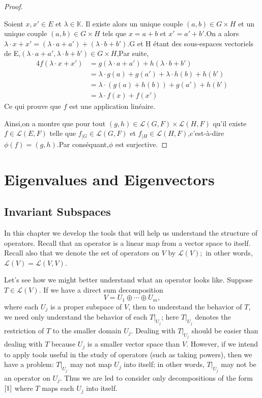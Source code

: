 \documentclass[12pt]{book}
\theoremstyle{definition}\newtheorem{dfn}{Définition}[chapter]
\theoremstyle{plain}\newtheorem{thm}{Théorème}[chapter]
\theoremstyle{plain}\newtheorem{prp}{Proposition}[chapter]
\theoremstyle{plain}\newtheorem{lem}{\bf Lemme}[chapter]
\theoremstyle{plain}\newtheorem{axm}{\bf Axiome}[chapter]
\theoremstyle{plain}\newtheorem{lmm}{\bf Lemme}[chapter]
\theoremstyle{plain}\newtheorem{exm}{\bf Example}[chapter]
\theoremstyle{plain}\newtheorem{cor}{\bf Corollaire}[chapter]
\theoremstyle{remark}\newtheorem{rem}{Remarque}[chapter]
\begin{document}
\begin{proof}
\begin{itemize}
\begin{itemize}
 Soient $x,x'\in E$ et $\lambda \in \mathbb{K}$.
 Il existe alors un unique couple $(a,b)\in G\times H$ et un unique couple $(a,b)\in G\times H$ tels que $x=a+b$ et $x'=a'+b'$.On a alors $\lambda \cdot x+x'=(\lambda\cdot a+a')+(\lambda\cdot b+b')$.G et H étant des sous-espaces vectoriels de E,$ (\lambda\cdot a+a',\lambda\cdot b+b')\in G\times H$,Par suite,
 \begin{alignat*}{4}
 f(\lambda\cdot x+x')&=g(\lambda\cdot a+a')+h(\lambda\cdot b+b')\\
 &=\lambda \cdot g(a)+g(a')+\lambda\cdot h(b)+h(b')\\
 &=\lambda\cdot(g(a)+h(b))+g(a')+h(b')\\
 &=\lambda\cdot f(x)+f(x')
 \end{alignat*}
 Ce qui prouve que $f$ est une application linéaire.
\end{itemize}
\end{itemize}
Ainsi,on a montre que pour tout $(g,h)\in \mathcal{L}(G,F)\times \mathcal{L}(H,F)$ qu'il existe $f\in \mathcal{L}(E,F)$ telle que
$f_{|G}\in\mathcal{L}(G,F)$
et $f_{|H}\in\mathcal{L}(H,F)$,c'est-à-dire $\phi(f)=(g,h)$.Par conséquant,$\phi$ est surjective.

\end{proof}

\chapter{Eigenvalues and Eigenvectors}
\section{Invariant Subspaces}
In this chapter we develop the tools that will help us understand the structure of operators. Recall that an operator is a linear map from a vector space to itself. Recall also that we denote the set of operators on $V$ by $\mathcal{L}(V) ;$ in other words, $\mathcal{L}(V)=\mathcal{L}(V, V)$.

Let's see how we might better understand what an operator looks like. Suppose $T \in \mathcal{L}(V)$. If we have a direct sum decomposition
\begin{equation}
V=U_{1} \oplus \cdots \oplus U_{m},\label{1}
\end{equation}
where each $U_{j}$ is a proper subspace of $V$, then to understand the behavior of $T$, we need only understand the behavior of each $\left.T\right|_{U_{j}}$; here $\left.T\right|_{U_{j}}$ denotes the restriction of $T$ to the smaller domain $U_{j} .$ Dealing with $\left.T\right|_{U_{j}}$ should be easier than dealing with $T$ because $U_{j}$ is a smaller vector space than $V$. However, if we intend to apply tools useful in the study of operators (such as taking powers), then we have a problem:
$\left.T\right|_{U_{j}}$ may not map $U_{j}$ into itself; in other words, $\left.T\right|_{U_{j}}$ may not be an operator on $U_{j}$. Thus we are led to consider only decompositions of the form $\ref{1}$ where $T$ maps each $U_{j}$ into itself.
\end{document}
